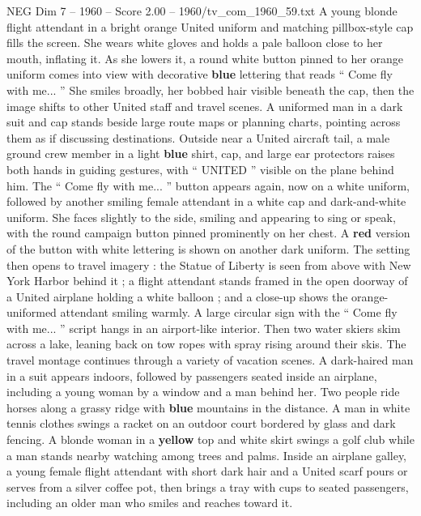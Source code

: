 \begin{textsample}{NEG Dim 7 – 1960 – Score 2.00 – 1960/tv\_com\_1960\_59.txt}  \label{ex:f7_neg_080}
A young blonde flight attendant in a bright orange United uniform and matching pillbox-style cap fills the screen.
She wears white gloves and holds a pale balloon close to her mouth, inflating it.
As she lowers it, a round white button pinned to her orange uniform comes into view with decorative \textbf{blue} lettering that reads “ Come fly with me... ” She smiles broadly, her bobbed hair visible beneath the cap, then the image shifts to other United staff and travel scenes.
A uniformed man in a dark suit and cap stands beside large route maps or planning charts, pointing across them as if discussing destinations.
Outside near a United aircraft tail, a male ground crew member in a light \textbf{blue} shirt, cap, and large ear protectors raises both hands in guiding gestures, with “ UNITED ” visible on the plane behind him.
The “ Come fly with me... ” button appears again, now on a white uniform, followed by another smiling female attendant in a white cap and dark-and-white uniform.
She faces slightly to the side, smiling and appearing to sing or speak, with the round campaign button pinned prominently on her chest.
A \textbf{red} version of the button with white lettering is shown on another dark uniform.
The setting then opens to travel imagery : the Statue of Liberty is seen from above with New York Harbor behind it ; a flight attendant stands framed in the open doorway of a United airplane holding a white balloon ; and a close-up shows the orange-uniformed attendant smiling warmly.
A large circular sign with the “ Come fly with me... ” script hangs in an airport-like interior.
Then two water skiers skim across a lake, leaning back on tow ropes with spray rising around their skis.
The travel montage continues through a variety of vacation scenes.
A dark-haired man in a suit appears indoors, followed by passengers seated inside an airplane, including a young woman by a window and a man behind her.
Two people ride horses along a grassy ridge with \textbf{blue} mountains in the distance.
A man in white tennis clothes swings a racket on an outdoor court bordered by glass and dark fencing.
A blonde woman in a \textbf{yellow} top and white skirt swings a golf club while a man stands nearby watching among trees and palms.
Inside an airplane galley, a young female flight attendant with short dark hair and a United scarf pours or serves from a silver coffee pot, then brings a tray with cups to seated passengers, including an older man who smiles and reaches toward it.

\end{textsample}
